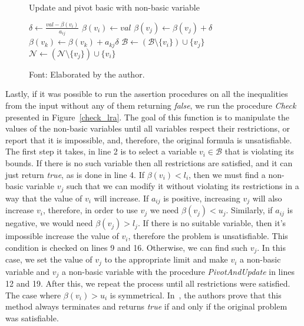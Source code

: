 \begin{figure}[t]
\caption{Update and pivot basic with non-basic variable}
\begin{algorithmic}[1]
    \State $\delta \gets \frac{val - \beta(v_{i})}{a_{ij}}$
    \State $\beta(v_{i}) \gets val$
    \State $\beta(v_{j}) \gets \beta(v_{j}) + \delta$
      \State~$\beta(v_{k}) \gets \beta(v_{k}) + a_{kj}\delta$
    \EndFor
    \State $\mathcal{B} \gets (\mathcal{B} \setminus \{v_{i}\}) \cup \{v_{j}\}$
    \State $\mathcal{N} \gets (\mathcal{N} \setminus \{v_{j}\}) \cup \{v_{i}\}$
  \EndProcedure
\end{algorithmic}
\caption*{Font: Elaborated by the author.}
\end{figure}

Lastly, if it was possible to run the assertion procedures on all the inequalities from the input without any of them returning \textit{false}, we run the procedure \textit{Check} presented in Figure~\ref{check_lra}. The goal of this function is to manipulate the values of the non-basic variables until all variables respect their restrictions, or report that it is impossible, and, therefore, the original formula is unsatisfiable. The first step it takes, in line 2 is to select a variable $v_{i} \in \mathcal{B}$ that is violating its bounds. If there is no such variable then all restrictions are satisfied, and it can just return \textit{true}, as is done in line 4. If $\beta(v_{i}) < l_{i}$, then we must find a non-basic variable $v_{j}$ such that we can modify it without violating its restrictions in a way that the value of $v_{i}$ will increase. If $a_{ij}$ is positive, increasing $v_{j}$ will also increase $v_{i}$, therefore, in order to use $v_{j}$ we need $\beta(v_{j}) < u_{j}$. Similarly, if $a_{ij}$ is negative, we would need $\beta(v_{j}) > l_{j}$. If there is no suitable variable, then it's impossible increase the value of $v_{i}$, therefore the problem is unsatisfiable. This condition is checked on lines 9 and 16. Otherwise, we can find such $v_{j}$. In this case, we set the value of $v_{j}$ to the appropriate limit and make $v_{i}$ a non-basic variable and $v_{j}$ a non-basic variable with the procedure \textit{PivotAndUpdate} in lines 12 and 19. After this, we repeat the process until all restrictions were satisfied. The case where $\beta(v_{i}) > u_{i}$ is symmetrical. In~\cite{simplex_dpllt}, the authors prove that this method always terminates and returns \textit{true} if and only if the original problem was satisfiable.

